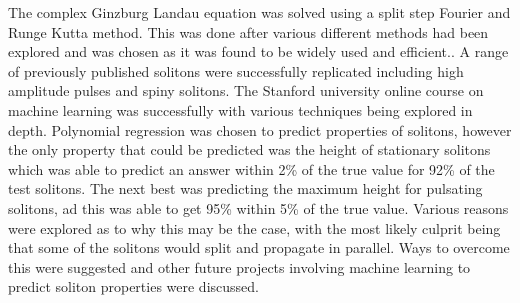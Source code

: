 \documentclass[a4paper,12pt]{report}
\begin{document}
The complex Ginzburg Landau equation was solved using a split step Fourier and Runge Kutta method. This was done after various different methods had been explored and was chosen as it was found to be widely used and efficient.\cite{2001, taha, bch}. A range of previously published solitons were successfully replicated including high amplitude pulses and spiny solitons. The Stanford university online course on machine learning was successfully with various techniques being explored in depth. Polynomial regression was chosen to predict properties of solitons, however the only property that could be predicted was the height of stationary solitons which was able to predict an answer within 2\% of the true value for 92\% of the test solitons. The next best was predicting the maximum height for pulsating solitons, ad this was able to get 95\% within 5\% of the true value. Various reasons were explored as to why this may be the case, with the most likely culprit being that some of the solitons would split and propagate in parallel. Ways to overcome this were suggested and other future projects involving machine learning to predict soliton properties were discussed. 
\end{document}
